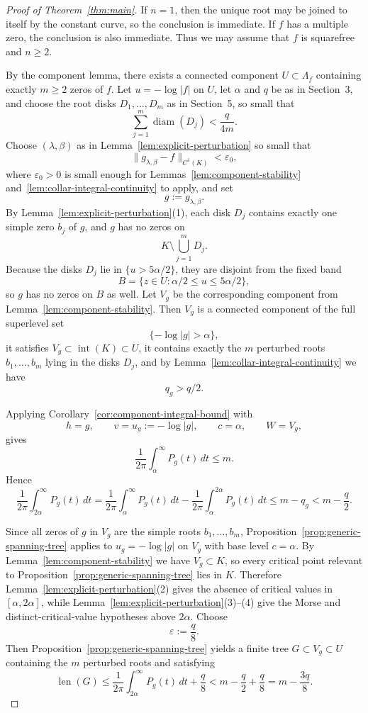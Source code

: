 \documentclass[12pt]{amsart}
\DeclareMathOperator{\len}{len}
\theoremstyle{definition}
\theoremstyle{remark}
\begin{document}
\begin{proof}[Proof of Theorem~\ref{thm:main}]
If $n=1$, then the unique root may be joined to itself by the constant curve, so the conclusion is immediate. If $f$ has a multiple zero, the conclusion is also immediate. Thus we may assume that $f$ is squarefree and $n\ge 2$.

\indent By the component lemma, there exists a connected component $U\subset \Lambda_f$ containing exactly
$m\ge 2$ zeros of $f$. Let $u=-\log|f|$ on $U$, let $\alpha$ and $q$ be as in Section~3, and choose the root disks
$D_1,\dots,D_m$ as in Section~5, so small that
\begin{equation}
\sum_{j=1}^m \operatorname{diam}(D_j)<\frac{q}{4m}.
\tag{17}
\end{equation}
Choose $(\lambda,\beta)$ as in Lemma~\ref{lem:explicit-perturbation} so small that
\[
\|g_{\lambda,\beta}-f\|_{C^1(K)}<\varepsilon_0,
\]
where $\varepsilon_0>0$ is small enough for Lemmas~\ref{lem:component-stability} and~\ref{lem:collar-integral-continuity} to apply, and set
\[
g:=g_{\lambda,\beta}.
\]
By Lemma~\ref{lem:explicit-perturbation}(1), each disk $D_j$ contains exactly one simple zero $b_j$ of $g$, and
$g$ has no zeros on
\[
K\setminus \bigcup_{j=1}^m D_j.
\]
Because the disks $D_j$ lie in $\{u>5\alpha/2\}$, they are disjoint from the fixed band
\[
B=\{z\in U:\alpha/2\le u\le 5\alpha/2\},
\]
so $g$ has no zeros on $B$ as well. Let $V_g$ be the corresponding component from
Lemma~\ref{lem:component-stability}. Then $V_g$ is a connected component of the full superlevel set
\[
\{-\log|g|>\alpha\},
\]
it satisfies $V_g\subset \operatorname{int}(K)\subset U$, it contains exactly the $m$
perturbed roots $b_1,\dots,b_m$ lying in the disks $D_j$, and by Lemma~\ref{lem:collar-integral-continuity} we have
\[
q_g>q/2.
\]

Applying Corollary~\ref{cor:component-integral-bound} with
\[
h=g,
\qquad
v=u_g:=-\log|g|,
\qquad
c=\alpha,
\qquad
W=V_g,
\]
gives
\[
\frac1{2\pi}\int_\alpha^\infty P_g(t)\,dt\le m.
\]
Hence
\[
\frac1{2\pi}\int_{2\alpha}^\infty P_g(t)\,dt
=
\frac1{2\pi}\int_{\alpha}^\infty P_g(t)\,dt
-
\frac1{2\pi}\int_{\alpha}^{2\alpha} P_g(t)\,dt
\le m-q_g
<
m-\frac q2.
\]

Since all zeros of $g$ in $V_g$ are the simple roots $b_1,\dots,b_m$, Proposition~\ref{prop:generic-spanning-tree} applies to $u_g=-\log|g|$ on $V_g$ with base level $c=\alpha$. By Lemma~\ref{lem:component-stability} we have $V_g\subset K$, so every critical point relevant to Proposition~\ref{prop:generic-spanning-tree} lies in $K$. Therefore Lemma~\ref{lem:explicit-perturbation}(2) gives the absence of critical values in $[\alpha,2\alpha]$, while Lemma~\ref{lem:explicit-perturbation}(3)--(4) give the Morse and distinct-critical-value hypotheses above $2\alpha$. Choose
\[
\varepsilon:=\frac q8.
\]
Then Proposition~\ref{prop:generic-spanning-tree} yields a finite tree \(G\subset V_g\subset U\) containing the \(m\) perturbed roots
and satisfying
\[
\len(G)\le \frac1{2\pi}\int_{2\alpha}^\infty P_g(t)\,dt+\frac q8
<
m-\frac q2+\frac q8
=
m-\frac{3q}{8}.
\]


\end{proof}
\end{document}
